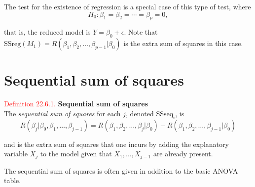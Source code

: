 \documentclass[
]{book}
\begin{document}
The test for the existence of regression is a special case of this type of test, where\\

\[H_0: \beta_1=\beta_2=\cdots=\beta_p=0,\]

that is, the reduced model is \(Y = \beta_0 + \epsilon\). Note that \(\text{SSreg}(M_1) = R(\beta_1,\beta_2,\dots,\beta_{p-1} | \beta_0 )\) is the extra sum of squares in this case.

\hypertarget{Sec_Linear_ANOVA:seq}{%
\section{Sequential sum of squares}\label{Sec_Linear_ANOVA:seq}}

\hypertarget{Sec_Linear_ANOVA:def:sss}{}
\textcolor{red}{Definition 22.6.1.}
{\textbf{Sequential sum of squares}}\\
The \emph{sequential sum of squares} for each \(j\), denoted \(\text{SSseq}_{i}\), is\\

\[R(\beta_j | \beta_0,\beta_1,\dots,\beta_{j-1}) = R(\beta_1,\beta_2,\dots,\beta_j | \beta_0) - R(\beta_1,\beta_2,\dots,\beta_{j-1} | \beta_0) \]

and is the extra sum of squares that one incurs by adding the explanatory variable \(X_j\) to the model given that \(X_1,\dots,X_{j-1}\) are already present.

The sequential sum of squares is often given in addition to the basic ANOVA table.
\end{document}

